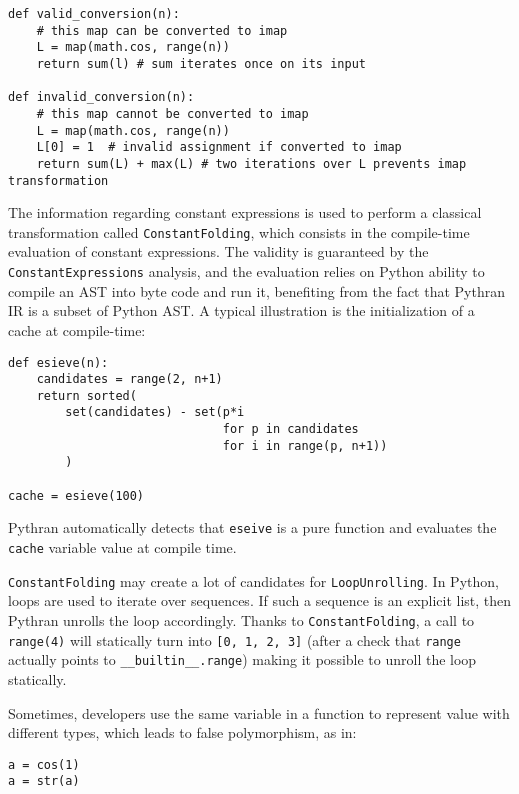 \documentclass[10pt, onecolumn, preprint]{sigplanconf}
\begin{document}
\begin{lstlisting}
def valid_conversion(n):
    # this map can be converted to imap
    L = map(math.cos, range(n))
    return sum(l) # sum iterates once on its input

def invalid_conversion(n):
    # this map cannot be converted to imap
    L = map(math.cos, range(n))
    L[0] = 1  # invalid assignment if converted to imap
    return sum(L) + max(L) # two iterations over L prevents imap transformation
\end{lstlisting}

The information regarding constant expressions is used to perform a classical
transformation called \texttt{ConstantFolding}, which consists in the compile-time
evaluation of constant expressions. The validity is guaranteed by the
\texttt{ConstantExpressions} analysis, and the evaluation relies on Python ability to
compile an AST into byte code and run it, benefiting from the fact that Pythran
IR is a subset of Python AST. A typical illustration is the initialization of a
cache at compile-time:

\begin{lstlisting}
def esieve(n):
    candidates = range(2, n+1)
    return sorted(
        set(candidates) - set(p*i
                              for p in candidates
                              for i in range(p, n+1))
        )

cache = esieve(100)
\end{lstlisting}

Pythran automatically detects that \texttt{eseive} is a pure function and evaluates
the \texttt{cache} variable value at compile time.

\texttt{ConstantFolding} may create a lot of candidates for 
\texttt{LoopUnrolling}. In Python, loops are used to iterate over sequences. If
such a sequence is an explicit list, then Pythran unrolls the loop accordingly.
Thanks to \texttt{ConstantFolding}, a call to \texttt{range(4)} will statically
turn into \texttt{[0, 1, 2, 3]} (after a check that \texttt{range} actually
points to \texttt{\_\_builtin\_\_.range}) making it possible to unroll the loop
statically.

Sometimes, developers use the same variable in a function to represent value 
with different types, which leads to false polymorphism, as in:

\begin{lstlisting}
a = cos(1)
a = str(a)
\end{lstlisting}
\end{document}

